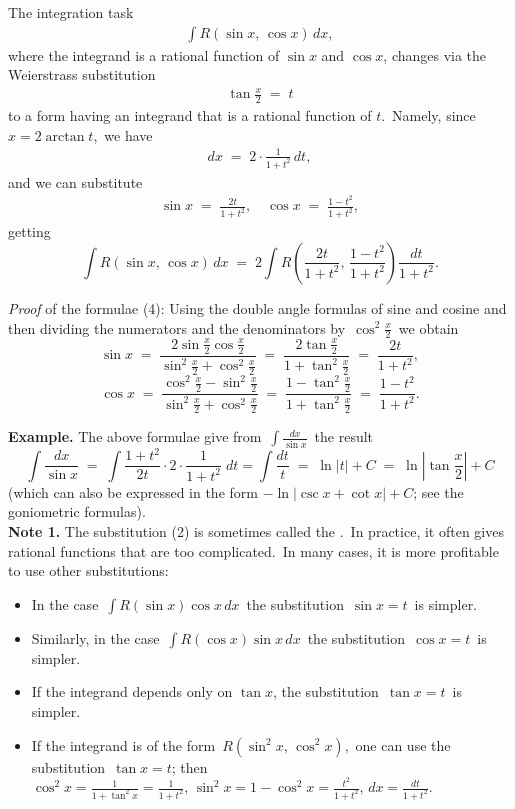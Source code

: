 \documentclass[12pt]{article}
\theoremstyle{definition}
\begin{document}
The integration task
\begin{align}
   \int\!R(\sin{x},\,\cos{x})\,dx,
\end{align}
where the integrand is a rational function of $\sin{x}$ and $\cos{x}$, changes via the Weierstrass substitution
\begin{align}
   \tan\frac{x}{2} \;=\; t
\end{align}
to a form having an integrand that is a rational function of $t$.\, Namely, since\, $x = 2\arctan{t}$,\, we have 
\begin{align}
dx \;=\; 2\cdot\frac{1}{1\!+\!t^2}\,dt,
\end{align}
and we can substitute
\begin{align}
   \sin{x}\;=\; \frac{2t}{1\!+\!t^2}, \quad \cos{x} \;=\; \frac{1\!-\!t^2}{1\!+\!t^2},
\end{align}
getting
$$\int\!R(\sin{x},\,\cos{x})\,dx \;=\; 
2\int\!R\!\left(\frac{2t}{1\!+\!t^2},\,\frac{1\!-\!t^2}{1\!+\!t^2}\right)\frac{dt}{1\!+\!t^2}.$$

{\em Proof} of the formulae (4):\; Using the double angle formulas of sine and cosine and then dividing the numerators and the denominators by\, $\cos^2\frac{x}{2}$\, we obtain
$$\sin{x} \;=\; 
\frac{2\sin\frac{x}{2}\cos\frac{x}{2}}{\sin^2\frac{x}{2}+\cos^2\frac{x}{2}}
 \;=\; \frac{2\tan\frac{x}{2}}{1+\tan^2\frac{x}{2}} \;=\; \frac{2t}{1+t^2},$$
$$\cos{x} \;=\; \frac{\cos^2\frac{x}{2}-\sin^2\frac{x}{2}}{\sin^2\frac{x}{2}+\cos^2\frac{x}{2}} 
\;=\; \frac{1-\tan^2\frac{x}{2}}{1+\tan^2\frac{x}{2}} \;=\; \frac{1-t^2}{1+t^2}.$$

\textbf{Example.}\; The above formulae give from\, $\displaystyle \int\frac{dx}{\sin{x}}$\, the result
$$\int\frac{dx}{\sin{x}} \;=\; \int\frac{1\!+\!t^2}{2t}\cdot2\cdot\frac{1}{1\!+\!t^2}\;dt = 
\int\frac{dt}{t} \;=\; \ln|t|+C \;=\; \ln\left|\tan\frac{x}{2}\right|+C$$
(which can also be expressed in the form $-\ln|\csc{x}+\cot{x}|+C$; see the goniometric formulas).\\

\textbf{Note 1.}\; The substitution (2) is sometimes called the .\, In practice, it often gives rational functions that are too complicated.\, In many cases, it is more profitable to use other substitutions:
\begin{itemize}
\item In the case\, $\int\!R(\sin{x})\cos{x}\,dx$\, the substitution\, $\sin{x} = t$\, is simpler.
\item Similarly, in the case\, $\int\!R(\cos{x})\sin{x}\,dx$\, the substitution\, $\cos{x} = t$\, is simpler. 
\item If the integrand depends only on $\tan{x}$, the substitution\, $\tan{x} = t$\, is simpler.
\item If the integrand is of the form\, $R(\sin^2{x},\, \cos^2{x})$,\, one can use the substitution\, $\tan{x} = t$; then\\
$\displaystyle \cos^2{x} = \frac{1}{1+\tan^2{x}} = \frac{1}{1+t^2}$,\;\; $\displaystyle \sin^2{x} = 1-\cos^2{x} = \frac{t^2}{1+t^2}$,\;\; $\displaystyle dx = \frac{dt}{1+t^2}.$
\end{itemize}
\end{document}
